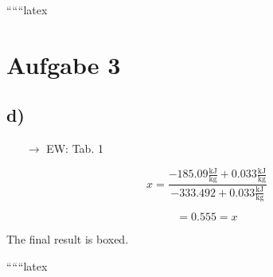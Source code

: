 ``````latex


\section*{Aufgabe 3}

\subsection*{d)}

\begin{itemize}
    \item[$\rightarrow$] EW: Tab. 1
\end{itemize}

\[
x = \frac{-185.09 \frac{\text{kJ}}{\text{kg}} + 0.033 \frac{\text{kJ}}{\text{kg}}}{-333.492 + 0.033 \frac{\text{kJ}}{\text{kg}}}
\]

\[
= 0.555 = x
\]

The final result is boxed.

``````latex


